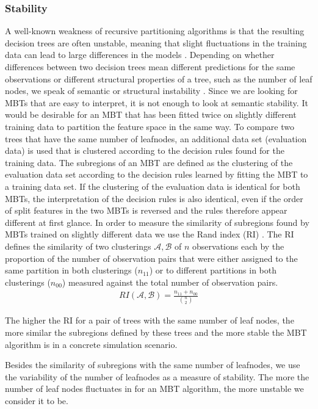 \subsubsection{Stability}
A well-known weakness of recursive partitioning algorithms is that the resulting decision trees are often unstable, meaning that slight fluctuations in the training data can lead to large differences in the models \citep{Fokkema.2020}.
Depending on whether differences between two decision trees mean different predictions for the same observations or different structural properties of a tree, such as the number of leaf nodes, we speak of semantic or structural instability \citep{Wang.2018}. 
Since we are looking for MBTs that are easy to interpret, it is not enough to look at semantic stability. It would be desirable for an MBT that has been fitted twice on slightly different training data to partition the feature space in the same way. To compare two trees that have the same number of leafnodes, an additional data set (evaluation data) is used that is clustered according to the decision rules found for the training data. The subregions of an MBT are defined as the clustering of the evaluation data set according to the decision rules learned by fitting the MBT to a training data set. 
If the clustering of the evaluation data is identical for both MBTs, the interpretation of the decision rules is also identical, even if the order of split features in the two MBTs is reversed and the rules therefore appear different at first glance.
In order to measure the similarity of subregions found by MBTs trained on slightly different data we use the Rand index (RI) \citep{Rand.1971}. The RI defines the similarity of two clusterings $\mathcal{A}, \mathcal{B}$ of $n$ observations each by the proportion of  the number of observation pairs that were either assigned to the same partition in both clusterings ($n_{11}$) or to different partitions in both clusterings ($n_{00}$) measured against the total number of observation pairs. 
\begin{align}
    RI(\mathcal{A}, \mathcal{B}) = \frac{n_{11} + n_{00}}{\binom{n}{2}}
\end{align}
\citep{Gates.2017}

The higher the RI for a pair of trees with the same number of leaf nodes, the more similar the subregions defined by these trees and the more stable the MBT algorithm is in a concrete simulation scenario. 


Besides the similarity of subregions with the same number of leafnodes, we use the variability of the number of leafnodes as a measure of stability. The more the number of leaf nodes fluctuates in for an MBT algorithm, the more unstable we consider it to be.

